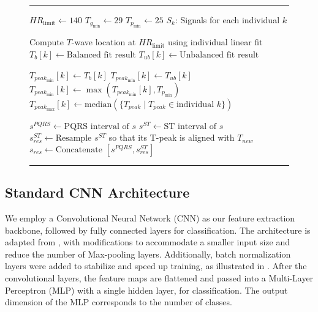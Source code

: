 \begin{figure}[!t]
\hrule\noindent
{}
\begin{algorithmic}[1]
    \STATE {}
    \STATE $HR_{\text{limit}} \gets 140$ 
    \STATE $T_{g_{\text{min}}} \gets 29$ 
    \STATE $T_{p_{\text{min}}} \gets 25$ 
    \STATE $S_k$: Signals for each individual $k$

    \STATE {}
        \STATE Compute $T$-wave location at $HR_{\text{limit}}$ using individual linear fit \label{lst:line:pa_start}
        \STATE \hspace{0.5em} $T_b[k] \gets \text{Balanced fit result}$
        \STATE \hspace{0.5em} $T_{ub}[k] \gets \text{Unbalanced fit result}$

            \STATE $T_{peak_{\text{min}}}[k] \gets T_b[k]$
        \ELSE
            \STATE $T_{peak_{\text{min}}}[k] \gets T_{ub}[k]$
        \ENDIF
        \STATE $T_{peak_{\text{min}}}[k] \gets \max(T_{peak_{\text{min}}}[k], T_{p_{\text{min}}})$
        \STATE $T_{peak_{\text{max}}}[k] \gets \text{median}(\{T_{peak} \mid T_{peak} \in \text{individual } k\})$ \label{lst:line:pa_end}

                \STATE $s^{PQRS} \gets \text{PQRS interval of }s$
                \STATE $s^{ST} \gets \text{ST interval of }s$
                \STATE $s^{ST}_{res} \gets \text{Resample } s^{ST}$ so that its T-peak is aligned with  $T_{new}$
                \STATE $s_{res} \gets \text{Concatenate }[s^{PQRS}, s^{ST}_{res}]$
            \ENDFOR
        \ENDFOR
    \ENDFOR
\end{algorithmic}
\noindent\hrule
{}
\label{alg:individual_augmentation}
\end{figure}
\subsection{Standard CNN Architecture}
We employ a Convolutional Neural Network (CNN) as our feature extraction backbone, followed by fully connected layers for classification. The architecture is adapted from \cite{9211012}, with modifications to accommodate a smaller input size and reduce the number of Max-pooling layers. Additionally, batch normalization layers were added to stabilize and speed up training, as illustrated in . After the convolutional layers, the feature maps are flattened and passed into a Multi-Layer Perceptron (MLP) with a single hidden layer, for classification. The output dimension of the MLP corresponds to the number of classes.


